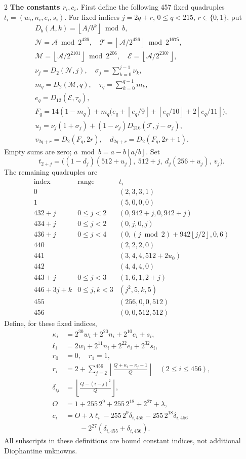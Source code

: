 \documentclass[10pt]{article}
\let\bigsum\sum
\renewcommand{\sum}{\bigsum\nolimits}
\newcommand{\fl}[1]{\left\lfloor #1\right\rfloor}
\begin{document}
\begin{multicols}{2}
\textbf{The constants $r_i,c_i$.}
First define the following 457 fixed quadruples
$t_i=(w_i,n_i,e_i,s_i)$.
For fixed indices $j=2q+r$, $0\le q<215$, $r\in\{0,1\}$, put
\[
\begin{gathered}
D_b(A,k)=\fl{A/b^k}\bmod b,\\
\mathcal N=\mathcal A\bmod2^{426},\quad
\mathcal T=\fl{\mathcal A/2^{426}}\bmod2^{1675},\\
\mathcal M=\fl{\mathcal A/2^{2101}}\bmod2^{206},\quad
\mathcal E=\fl{\mathcal A/2^{2307}},\\
\nu_j=D_2(\mathcal N,j),\quad \sigma_j=\sum_{k=0}^{j-1}\nu_k,\\
m_q=D_2(\mathcal M,q),\quad \tau_q=\sum_{k=0}^{q-1}m_k,\\
e_q=D_{12}(\mathcal E,\tau_q),\\
F_q=14(1-m_q)+m_q\bigl(e_q+\fl{e_q/9}+\fl{e_q/10}+2\fl{e_q/11}\bigr),\\
u_j=\nu_j(1+\sigma_j)+(1-\nu_j)D_{216}(\mathcal T,j-\sigma_j),\\
v_{2q+r}=D_2(F_q,2r),\quad d_{2q+r}=D_2(F_q,2r+1).
\end{gathered}
\]
Empty sums are zero; $a\bmod b=a-b\fl{a/b}$. Set
\[
t_{2+j}=\bigl((1-d_j)(512+u_j),\ 512+j,\ d_j(256+u_j),\ v_j\bigr).
\]
The remaining quadruples are
\[
\begin{array}{c|c|l}
\text{index}&\text{range}&t_i\\\hline
0&& (2,3,3,1)\\
1&& (5,0,0,0)\\
432+j&0\le j<2&(0,942+j,0,942+j)\\
434+j&0\le j<2&(0,j,0,j)\\
436+j&0\le j<4&(0,(j\bmod2)+942\fl{j/2},0,6)\\
440&&(2,2,2,0)\\
441&&(3,4,4,512+2u_0)\\
442&&(4,4,4,0)\\
443+j&0\le j<3&(1,6,1,2+j)\\
446+3j+k&0\le j,k<3&(j^2,5,k,5)\\
455&&(256,0,0,512)\\
456&&(0,0,512,512)
\end{array}
\]
Define, for these fixed indices,
\begin{align*}
\kappa_i&=2^{30}w_i+2^{20}n_i+2^{10}e_i+s_i,\\
\ell_i&=2w_i+2^{11}n_i+2^{22}e_i+2^{32}s_i,\\
r_0&=0,\quad r_1=1,\\
r_i&=2+\sum_{j=2}^{456}\fl{\frac{Q+\kappa_i-\kappa_j-1}{Q}}
 \quad(2\le i\le456),\\
\delta_{ij}&=\fl{\frac{Q-(i-j)^2}{Q}},\\
O&=1+255\,2^9+255\,2^{18}+2^{27}+\lambda,\\
c_i&=O+\lambda\ell_i-255\,2^9\delta_{i,455}-255\,2^{18}\delta_{i,456}\\
 &\qquad -2^{27}(\delta_{i,455}+\delta_{i,456}).
\end{align*}
All subscripts in these definitions are bound constant indices, not
additional Diophantine unknowns.


\end{multicols}
\end{document}
